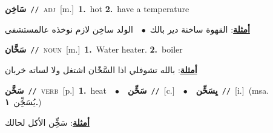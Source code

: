 \documentclass[10pt,a4paper,twoside]{article} %
\begin{document}
\begin{multicols}{2}
{\setlength\topsep{0pt}\textbf{\foreignlanguage{arabic}{سَاخِن}}\ {\color{gray}\texttt{//}\color{black}}\ \textsc{adj}\ [m.]\ \textbf{1.}~hot  \textbf{2.}~have a temperature\  \begin{flushright}\color{gray}\foreignlanguage{arabic}{\textbf{\underline{\foreignlanguage{arabic}{أمثلة}}}: القهوة ساخنة دير بالك\ $\bullet$\ \  الولد ساخِن لازم نوخذه عالمستشفى}\end{flushright}\color{black}} \vspace{2mm}

{\setlength\topsep{0pt}\textbf{\foreignlanguage{arabic}{سَخَّان}}\ {\color{gray}\texttt{//}\color{black}}\ \textsc{noun}\ [m.]\ \textbf{1.}~Water heater.  \textbf{2.}~boiler\  \begin{flushright}\color{gray}\foreignlanguage{arabic}{\textbf{\underline{\foreignlanguage{arabic}{أمثلة}}}: بالله تشوفلي اذا السَّخّان اشتغل ولا لساته خربان}\end{flushright}\color{black}} \vspace{2mm}

{\setlength\topsep{0pt}\textbf{\foreignlanguage{arabic}{سَخَّن}}\ {\color{gray}\texttt{//}\color{black}}\ \textsc{verb}\ [p.]\ \textbf{1.}~heat\ \ $\bullet$\ \ \setlength\topsep{0pt}\textbf{\foreignlanguage{arabic}{سَخِّن}}\ {\color{gray}\texttt{//}\color{black}}\ [c.]\ \ $\bullet$\ \ \setlength\topsep{0pt}\textbf{\foreignlanguage{arabic}{يِسَخِّن}}\ {\color{gray}\texttt{//}\color{black}}\ [i.]\ \color{gray}(msa. \foreignlanguage{arabic}{يُسَخِِّن}~\foreignlanguage{arabic}{\textbf{١.}})\color{black}\  \begin{flushright}\color{gray}\foreignlanguage{arabic}{\textbf{\underline{\foreignlanguage{arabic}{أمثلة}}}: سَخِِّن الأكل لحالك}\end{flushright}\color{black}} \vspace{2mm}


\end{multicols}
\end{document}
